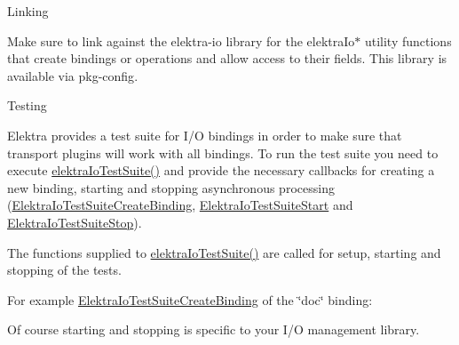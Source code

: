 \begin{DoxyParagraph}{Linking}

\end{DoxyParagraph}
Make sure to link against the {\ttfamily elektra-\/io} library for the {\ttfamily elektra\+Io$\ast$} utility functions that create bindings or operations and allow access to their fields. This library is available via {\ttfamily pkg-\/config}.

\begin{DoxyParagraph}{Testing}

\end{DoxyParagraph}
Elektra provides a test suite for I/O bindings in order to make sure that transport plugins will work with all bindings. To run the test suite you need to execute \mbox{\hyperlink{kdbiotest_8h_afe747efa9fd4b15b6c212ae7e1c51eb6}{elektra\+Io\+Test\+Suite()}} and provide the necessary callbacks for creating a new binding, starting and stopping asynchronous processing (\mbox{\hyperlink{kdbiotest_8h_a34b00a39be5b3f0a15959cda384e33dc}{Elektra\+Io\+Test\+Suite\+Create\+Binding}}, \mbox{\hyperlink{kdbiotest_8h_adc6ce3b9abbedf6ce56a5b0167d01286}{Elektra\+Io\+Test\+Suite\+Start}} and \mbox{\hyperlink{kdbiotest_8h_a0f56c00b010605d876c22d0c7a49aa0c}{Elektra\+Io\+Test\+Suite\+Stop}}).


\begin{DoxyCodeInclude}{0}
\DoxyCodeLine{\{}
\DoxyCodeLine{}
\DoxyCodeLine{}
\DoxyCodeLine{}
\DoxyCodeLine{\}}
\end{DoxyCodeInclude}
 The functions supplied to \mbox{\hyperlink{kdbiotest_8h_afe747efa9fd4b15b6c212ae7e1c51eb6}{elektra\+Io\+Test\+Suite()}} are called for setup, starting and stopping of the tests.

For example \mbox{\hyperlink{kdbiotest_8h_a34b00a39be5b3f0a15959cda384e33dc}{Elektra\+Io\+Test\+Suite\+Create\+Binding}} of the \char`\"{}doc\char`\"{} binding\+:


\begin{DoxyCodeInclude}{0}
\DoxyCodeLine{\{}
\DoxyCodeLine{\}}
\end{DoxyCodeInclude}
 Of course starting and stopping is specific to your I/O management library. 

